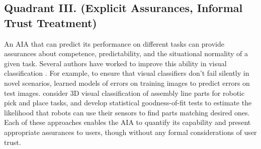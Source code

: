 \subsection{Quadrant III. (Explicit Assurances, Informal Trust Treatment)}\label{sec:q3}
An AIA that can predict its performance on different tasks can provide assurances about competence, predictability, and the situational normality of a given task. Several authors have worked to improve this ability in visual classification \cite{Zhang2014-he,Gurau2016-hs,Churchill2015-ei,Kaipa2015-hy}. 
For example, to ensure that visual classifiers don't fail silently in novel scenarios, 
\citet{Zhang2014-he} learned models of errors on training images to predict errors on test images. 
\citet{Kaipa2015-hy} consider 3D visual classification of assembly line parts for robotic pick and place tasks, and develop statistical goodness-of-fit tests to estimate the likelihood that robots can use their sensors to find parts matching desired ones. %
Each of these approaches enables the AIA to quantify its capability and present appropriate assurances to users, though without any formal considerations of user trust. 



